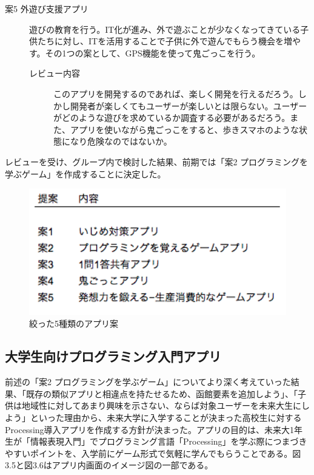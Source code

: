 \documentclass[openany,11pt,papersize]{jsbook}
\begin{document}
\begin{description}
 \item[案5 外遊び支援アプリ]
遊びの教育を行う。IT化が進み、外で遊ぶことが少なくなってきている子供たちに対し、ITを活用することで子供に外で遊んでもらう機会を増やす。その1つの案として、GPS機能を使って鬼ごっこを行う。
	\begin{description}
 	\item[レビュー内容]
	このアプリを開発するのであれば、楽しく開発を行えるだろう。しかし開発者が楽しくてもユーザーが楽しいとは限らない。ユーザーがどのような遊びを求めているか調査する必要があるだろう。また、アプリを使いながら鬼ごっこをすると、歩きスマホのような状態になり危険なのではないか。
	 \end{description}

 \end{description}
 
 \par レビューを受け、グループ内で検討した結果、前期では「案2 プログラミングを学ぶゲーム」を作成することに決定した。
 
 \begin{figure}[H]
\begin{center}
\includegraphics[width=12cm, bb=0 0 329 162]{img/AppIdea.png}
\end{center}
\caption{絞った5種類のアプリ案}
\end{figure}
 
 
 \subsection{大学生向けプログラミング入門アプリ}
\par 前述の「案2 プログラミングを学ぶゲーム」についてより深く考えていった結果、「既存の類似アプリと相違点を持たせるため、函館要素を追加しよう」、「子供は地域性に対してあまり興味を示さない、ならば対象ユーザーを未来大生にしよう」といった理由から、未来大学に入学することが決まった高校生に対するProcessing導入アプリを作成する方針が決まった。アプリの目的は、未来大1年生が「情報表現入門」でプログラミング言語「Processing」を学ぶ際につまづきやすいポイントを、入学前にゲーム形式で気軽に学んでもらうことである。図3.5と図3.6はアプリ内画面のイメージ図の一部である。
\end{document}
